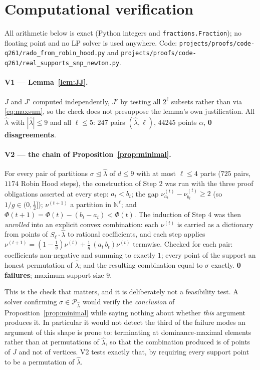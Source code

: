 \documentclass[11pt]{article}
\theoremstyle{plain}
\theoremstyle{definition}
\newcommand{\N}{\mathbb{N}}
\newcommand{\lhat}{\hat\lambda}
\newcommand{\Perm}{\mathcal{P}}
\begin{document}
\section{Computational verification}\label{sec:verification}

All arithmetic below is exact (Python integers and \texttt{fractions.Fraction});
no floating point and no LP solver is used anywhere. Code:
\texttt{projects/proofs/code-q261/rado\_from\_robin\_hood.py} and
\texttt{projects/proofs/code-q261/real\_supports\_snp\_newton.py}.

\paragraph{V1 --- Lemma~\ref{lem:JJ}.}
$J$ and $J'$ computed independently, $J'$ by testing all $2^{\ell}$ subsets
rather than via \eqref{eq:maxsum}, so the check does not presuppose the lemma's
own justification. All $\lhat$ with $|\lhat|\le 9$ and all $\ell\le 5$:
$247$ pairs $(\lhat,\ell)$, $44245$ points $\alpha$, \textbf{0 disagreements}.

\paragraph{V2 --- the chain of Proposition~\ref{prop:minimal}.}
For every pair of partitions $\sigma\trianglelefteq\lhat$ of $d\le 9$ with at
most $\ell\le 4$ parts ($725$ pairs, $1174$ Robin Hood steps), the construction
of Step 2 was run with the three proof obligations asserted at every step:
$a_t<b_t$; the gap $\nu^{(t)}_{a_t}-\nu^{(t)}_{b_t}\ge 2$ (so
$1/g\in(0,\tfrac12]$); $\nu^{(t+1)}$ a partition in $\N^{\ell}$; and
$\Phi(t+1)=\Phi(t)-(b_t-a_t)<\Phi(t)$. The induction of Step 4 was then
\emph{unrolled} into an explicit convex combination: each $\nu^{(t)}$ is carried
as a dictionary from points of $S_\ell\cdot\lhat$ to rational coefficients, and
each step applies
$\nu^{(t+1)}=(1-\tfrac1g)\nu^{(t)}+\tfrac1g\,(a_t\,b_t)\nu^{(t)}$ termwise.
Checked for each pair: coefficients non-negative and summing to exactly $1$;
every point of the support an honest permutation of $\lhat$; and the resulting
combination equal to $\sigma$ exactly. \textbf{0 failures}; maximum support size
$9$.

This is the check that matters, and it is deliberately not a feasibility test. A
solver confirming $\sigma\in\Perm_{\lhat}$ would verify the \emph{conclusion} of
Proposition~\ref{prop:minimal} while saying nothing about whether \emph{this}
argument produces it. In particular it would not detect the third of the failure
modes an argument of this shape is prone to: terminating at dominance-maximal
elements rather than at permutations of $\lhat$, so that the combination
produced is of points of $J$ and not of vertices. V2 tests exactly that, by
requiring every support point to be a permutation of $\lhat$.
\end{document}
